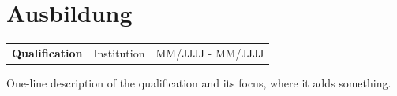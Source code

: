 \documentclass[a4paper,10pt]{article}
\newcommand{\headingeducation}{Ausbildung}
\begin{document}
\section{\headingeducation}

\begin{tabularx}{\linewidth}{@{}l X r@{}}
\textbf{Qualification} & Institution & MM/JJJJ - MM/JJJJ \\
\end{tabularx}
\vspace{-2mm}
{\small One-line description of the qualification and its focus, where it adds something.}


\vfill
{}
\end{document}

